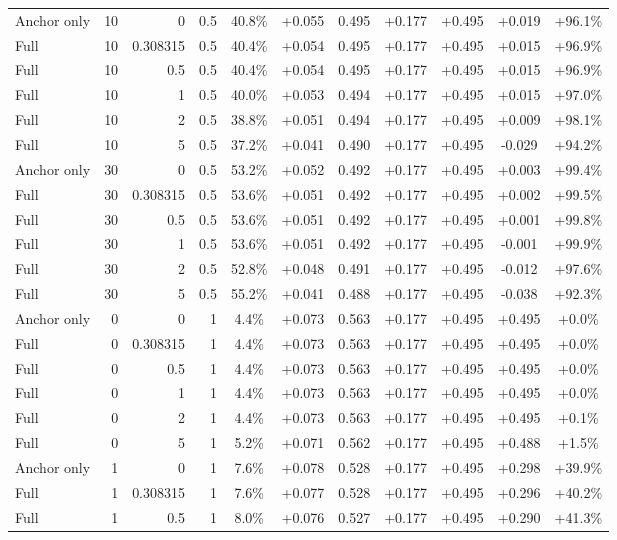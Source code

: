 \begin{table}[htbp]
\begin{tabular}{lrrrccccccc}
Anchor only & 10 & 0 & 0.5 & 40.8\% & +0.055 & 0.495 & +0.177 & +0.495 & +0.019 & +96.1\% \\
Full & 10 & 0.308315 & 0.5 & 40.4\% & +0.054 & 0.495 & +0.177 & +0.495 & +0.015 & +96.9\% \\
Full & 10 & 0.5 & 0.5 & 40.4\% & +0.054 & 0.495 & +0.177 & +0.495 & +0.015 & +96.9\% \\
Full & 10 & 1 & 0.5 & 40.0\% & +0.053 & 0.494 & +0.177 & +0.495 & +0.015 & +97.0\% \\
Full & 10 & 2 & 0.5 & 38.8\% & +0.051 & 0.494 & +0.177 & +0.495 & +0.009 & +98.1\% \\
Full & 10 & 5 & 0.5 & 37.2\% & +0.041 & 0.490 & +0.177 & +0.495 & -0.029 & +94.2\% \\
Anchor only & 30 & 0 & 0.5 & 53.2\% & +0.052 & 0.492 & +0.177 & +0.495 & +0.003 & +99.4\% \\
Full & 30 & 0.308315 & 0.5 & 53.6\% & +0.051 & 0.492 & +0.177 & +0.495 & +0.002 & +99.5\% \\
Full & 30 & 0.5 & 0.5 & 53.6\% & +0.051 & 0.492 & +0.177 & +0.495 & +0.001 & +99.8\% \\
Full & 30 & 1 & 0.5 & 53.6\% & +0.051 & 0.492 & +0.177 & +0.495 & -0.001 & +99.9\% \\
Full & 30 & 2 & 0.5 & 52.8\% & +0.048 & 0.491 & +0.177 & +0.495 & -0.012 & +97.6\% \\
Full & 30 & 5 & 0.5 & 55.2\% & +0.041 & 0.488 & +0.177 & +0.495 & -0.038 & +92.3\% \\
Anchor only & 0 & 0 & 1 & 4.4\% & +0.073 & 0.563 & +0.177 & +0.495 & +0.495 & +0.0\% \\
Full & 0 & 0.308315 & 1 & 4.4\% & +0.073 & 0.563 & +0.177 & +0.495 & +0.495 & +0.0\% \\
Full & 0 & 0.5 & 1 & 4.4\% & +0.073 & 0.563 & +0.177 & +0.495 & +0.495 & +0.0\% \\
Full & 0 & 1 & 1 & 4.4\% & +0.073 & 0.563 & +0.177 & +0.495 & +0.495 & +0.0\% \\
Full & 0 & 2 & 1 & 4.4\% & +0.073 & 0.563 & +0.177 & +0.495 & +0.495 & +0.1\% \\
Full & 0 & 5 & 1 & 5.2\% & +0.071 & 0.562 & +0.177 & +0.495 & +0.488 & +1.5\% \\
Anchor only & 1 & 0 & 1 & 7.6\% & +0.078 & 0.528 & +0.177 & +0.495 & +0.298 & +39.9\% \\
Full & 1 & 0.308315 & 1 & 7.6\% & +0.077 & 0.528 & +0.177 & +0.495 & +0.296 & +40.2\% \\
Full & 1 & 0.5 & 1 & 8.0\% & +0.076 & 0.527 & +0.177 & +0.495 & +0.290 & +41.3\% \\

\end{tabular}
\end{table}
